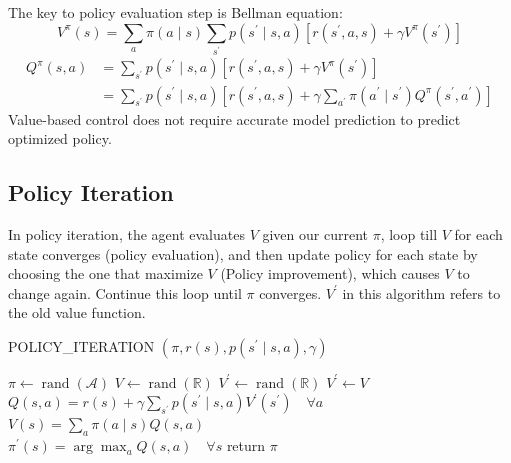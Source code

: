 \documentclass[11pt]{article}
\begin{document}
The key to policy evaluation step is Bellman equation:
\[ V^{\pi}(s)=\sum_{a} \pi(a \mid s) \sum_{s^{\prime}} p\left(s^{\prime} \mid s, a\right)\left[r\left(s^{\prime}, a, s\right)+\gamma V^{\pi}\left(s^{\prime}\right)\right] \]
\begin{equation*}
\begin{split}
Q^{\pi}(s, a) &= \sum_{s^{\prime}} p\left(s^{\prime} \mid s, a\right) \left[r\left(s^{\prime}, a, s\right) + \gamma V^{\pi}\left(s^{\prime}\right) \right] \\
&= \sum_{s^{\prime}} p\left(s^{\prime} \mid s, a\right) \left[r\left(s^{\prime}, a, s\right) + \gamma \sum_{a^{\prime}} \pi\left(a^{\prime} \mid s^{\prime}\right) Q^{\pi}\left(s^{\prime}, a^{\prime}\right) \right]
\end{split}
\end{equation*}
Value-based control does not require accurate model prediction to predict optimized policy.

\subsection{Policy Iteration}
In policy iteration, the agent evaluates $V$ given our current $\pi$, loop till $V$ for each state converges (policy evaluation), and then update policy for each state by choosing the one that maximize $V$ (Policy improvement), which causes $V$ to change again. Continue this loop until $\pi$ converges. $V^\prime$ in this algorithm refers to the old value function.

\begin{algorithm}[H]
\caption{POLICY\_ITERATION $\left(\pi, r(s), p\left(s^{\prime} \mid s, a\right), \gamma\right)$}
\label{algo:wma}
\begin{algorithmic}[1]
\State $\pi \leftarrow \operatorname{rand}(\mathcal{A})$
\State $V \leftarrow \operatorname{rand}(\mathbb{R})$
\State $V^{\prime} \leftarrow \operatorname{rand}(\mathbb{R})$
\While {$\pi^{\prime} \neq \pi$}
        \State $V^{\prime} \leftarrow V$
            \State $Q(s, a)=r(s)+\gamma \sum_{s^{\prime}} p\left(s^{\prime} \mid s, a\right) V^{\prime}\left(s^{\prime}\right) \quad \forall a $
            \State $V(s)=\sum_{a} \pi(a \mid s) Q(s, a)$
        \EndFor
    \EndWhile \\
    
    \State $\pi^{\prime}(s)=\arg \max _{a} Q(s, a) \quad \forall s$
\EndWhile
\State return $\pi$
\end{algorithmic}
\end{algorithm}
\end{document}
